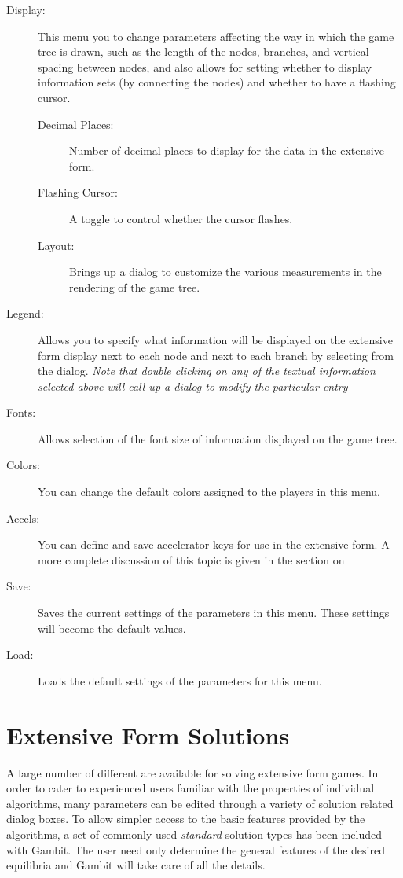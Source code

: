 \begin{description}
\item[Display:] This menu you to change parameters affecting the way
in which the game tree is drawn, such as the length of the nodes,
branches, and vertical spacing between nodes, and also allows for
setting whether to display information sets (by connecting the nodes)
and whether to have a flashing cursor.
\begin{description}
\item[Decimal Places:] Number of decimal places to display for the data in the extensive form.  
\item[Flashing Cursor:] A toggle to control whether the cursor
flashes.
\item[Layout:] Brings up a dialog to customize the various measurements in the rendering of the game tree.  
\end{description}
\item[Legend:] Allows you to specify what information will be
displayed on the extensive form display next to each node and next to
each branch by selecting from the  dialog.  
{\em Note that double clicking on any of the textual information selected 
above will call up a dialog to modify the particular entry}
\item[Fonts:] Allows selection of the font size of information
displayed on the game tree.
\item[Colors:] You can change the default colors assigned to the
players in this menu.
\item[Accels:] You can define and save accelerator keys for use in the
extensive form. A more complete discussion of this topic is given in
the section on 
\item[Save:] Saves the current settings of the parameters in this menu.  These settings will become the default values.
\item[Load:] Loads the default settings of the parameters for this
menu.
\end{description}

\section{Extensive Form Solutions}\label{ExtensiveFormSolutions}

A large number of different  
are available for solving extensive form games.  In order to cater to
experienced users familiar with the properties of individual
algorithms, many parameters can be edited through a variety of
solution related dialog boxes.  To allow simpler access to the basic
features provided by the algorithms, a set of commonly used {\em
standard} solution types has been included with Gambit.  The user need
only determine the general features of the desired equilibria and
Gambit will take care of all the details.

